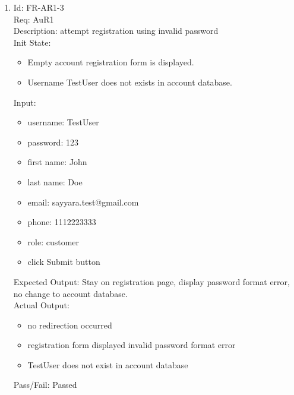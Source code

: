 \documentclass[12pt, titlepage]{article}
\begin{document}
\begin{enumerate}
    \item Id: FR-AR1-3\\
    Req: AuR1\\
    Description: attempt registration using invalid password\\
    Init State: \begin{itemize}[noitemsep,topsep=0pt]
        \item Empty account registration form is displayed.
        \item Username TestUser does not exists in account database.
    \end{itemize}
    Input: \begin{itemize}[noitemsep,topsep=0pt]
        \item username: TestUser
        \item password: 123
        \item first name: John
        \item last name: Doe
        \item email: sayyara.test@gmail.com
        \item phone: 1112223333
        \item role: customer
        \item click Submit button
    \end{itemize}
    Expected Output: Stay on registration page, display password format error, no change to account database.\\
    Actual Output: \begin{itemize}[noitemsep,topsep=0pt]
        \item no redirection occurred
        \item registration form displayed invalid password format error
        \item TestUser does not exist in account database
    \end{itemize}
    Pass/Fail: Passed
    
\end{enumerate}
\end{document}
